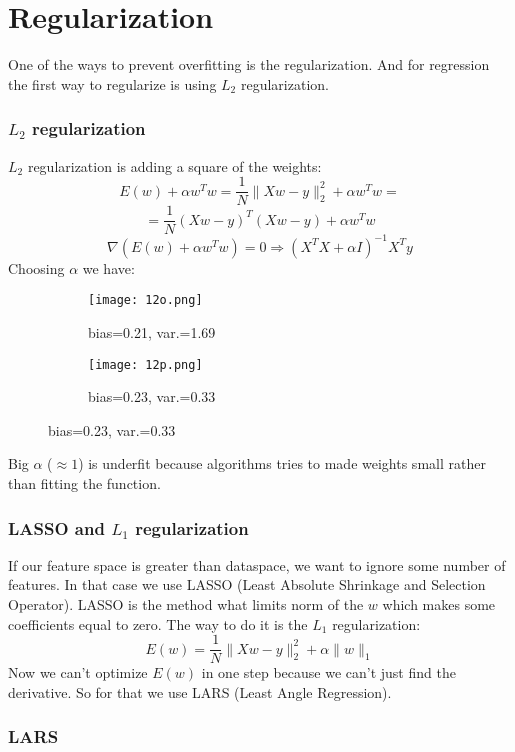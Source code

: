 \section{Regularization}

One of the ways to prevent overfitting is the regularization. And for regression the first way to regularize is using $L_2$ regularization.

\subsubsection*{$L_2$ regularization}

$L_2$ regularization is adding a square of the weights:
$$E(w) + \alpha w^Tw=\frac{1}{N}\|Xw-y\|_2^2+\alpha w^Tw=$$
$$=\frac{1}{N}(Xw-y)^T(Xw-y)+\alpha w^Tw$$
$$\nabla \left(E(w)+\alpha w^Tw\right)=0\Rightarrow\left(X^TX+\alpha I\right)^{-1}X^Ty$$
Choosing $\alpha$ we have:
\begin{figure}[H]
  \centering
  \begin{subfigure}[c]{0.28\linewidth}
    \texttt{[image: 12o.png]}
    \caption*{bias=0.21, var.=1.69}
  \end{subfigure}
  \hspace{2cm}
  \begin{subfigure}[c]{0.28\linewidth}
    \texttt{[image: 12p.png]}
    \caption*{bias=0.23, var.=0.33}
  \end{subfigure}
  \vspace{-0.4cm}
\end{figure}
Big $\alpha$ ($\approx1$) is underfit because algorithms tries to made weights small rather than fitting the function.

\subsubsection*{LASSO and $L_1$ regularization}

If our feature space is greater than dataspace, we want to ignore some number of features. In that case we use LASSO (Least Absolute Shrinkage and Selection Operator). LASSO is the method what limits norm of the $w$ which makes some coefficients equal to zero. The way to do it is the $L_1$ regularization:
$$E(w)=\frac{1}{N}\|Xw-y\|_2^2+\alpha\|w\|_1$$
Now we can't optimize $E(w)$ in one step because we can't just find the derivative. So for that we use LARS (Least Angle Regression).

\subsubsection*{LARS}

